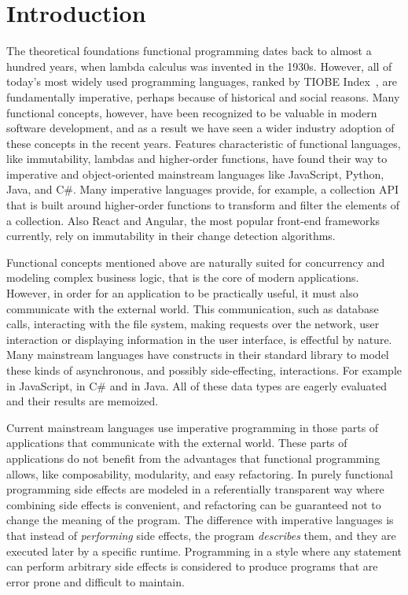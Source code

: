 \chapter{Introduction} \label{Introduction}
The theoretical foundations functional programming dates back to almost a hundred years, when lambda calculus was invented in the 1930s. However, all of today's most widely used programming languages, ranked by TIOBE Index~\cite{tiobe-index}, are fundamentally imperative, perhaps because of historical and social reasons. Many functional concepts, however, have been recognized to be valuable in modern software development, and as a result we have seen a wider industry adoption of these concepts in the recent years. Features characteristic of functional languages, like immutability, lambdas and higher-order functions, have found their way to imperative and object-oriented mainstream languages like JavaScript, Python, Java, and C\#. Many imperative languages provide, for example, a collection API that is built around higher-order functions to transform and filter the elements of a collection. Also React and Angular, the most popular front-end frameworks currently, rely on immutability in their change detection algorithms.

Functional concepts mentioned above are naturally suited for concurrency and modeling complex business logic, that is the core of modern applications. However, in order for an application to be practically useful, it must also communicate with the external world. This communication, such as database calls, interacting with the file system, making requests over the network, user interaction or displaying information in the user interface, is effectful by nature. Many mainstream languages have constructs in their standard library to model these kinds of asynchronous, and possibly side-effecting, interactions. For example  in JavaScript,  in C\# and  in Java. All of these data types are eagerly evaluated and their results are memoized.

Current mainstream languages use imperative programming in those parts of applications that communicate with the external world. These parts of applications do not benefit from the advantages that functional programming allows, like composability, modularity, and easy refactoring. In purely functional programming side effects are modeled in a referentially transparent way where combining side effects is convenient, and refactoring can be guaranteed not to change the meaning of the program. The difference with imperative languages is that instead of \textit{performing} side effects, the program \textit{describes} them, and they are executed later by a specific runtime. Programming in a style where any statement can perform arbitrary side effects is considered to produce programs that are error prone and difficult to maintain.~\cite[Chapter~3]{sicp}

